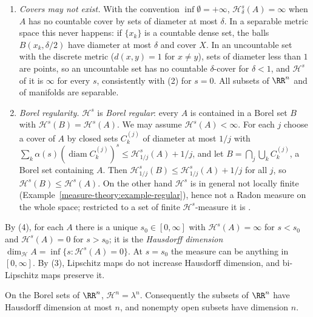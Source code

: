 \begin{remark}\label{geometric-measure-theory:remark-hausdorff-conventions}
\begin{enumerate}
\item \emph{Covers may not exist.} With the convention $\inf\emptyset = +\infty$, $\mathcal{H}^s_\delta(A) = \infty$ when $A$ has no countable cover by sets of diameter at most $\delta$. In a separable
metric space this never happens: if $\{x_k\}$ is a countable dense set, the balls $B(x_k, \delta/2)$ have diameter at most $\delta$ and cover $X$. In an uncountable set with the discrete metric
($d(x, y) = 1$ for $x \neq y$), sets of diameter less than $1$ are points, so an uncountable set has no countable $\delta$-cover for $\delta < 1$, and $\mathcal{H}^s$ of it is $\infty$ for every $s$,
consistently with (2) for $s = 0$. All subsets of $\RR^n$ and of manifolds are separable.
\item \emph{Borel regularity.} $\mathcal{H}^s$ is \emph{Borel regular}: every $A$ is contained in a Borel set $B$ with $\mathcal{H}^s(B) = \mathcal{H}^s(A)$. We may assume $\mathcal{H}^s(A) < \infty$. For
each $j$ choose a cover of $A$ by closed sets $C^{(j)}_k$ of diameter at most $1/j$ with $\sum_k\alpha(s)(\operatorname{diam}C^{(j)}_k)^s \leq \mathcal{H}^s_{1/j}(A) + 1/j$, and let
$B = \bigcap_j\bigcup_kC^{(j)}_k$, a Borel set containing $A$. Then $\mathcal{H}^s_{1/j}(B) \leq \mathcal{H}^s_{1/j}(A) + 1/j$ for all $j$, so $\mathcal{H}^s(B) \leq \mathcal{H}^s(A)$. On the other
hand $\mathcal{H}^s$ is in general not locally finite (Example~\ref{measure-theory:example-regular}), hence not a Radon measure on the whole space; restricted to a set of finite
$\mathcal{H}^s$-measure it is \cite[Section 1.1]{evans-gariepy}.
\end{enumerate}
\end{remark}

By (4), for each $A$ there is a unique $s_0 \in [0, \infty]$ with $\mathcal{H}^s(A) = \infty$ for $s < s_0$ and $\mathcal{H}^s(A) = 0$ for $s > s_0$; it is the \emph{Hausdorff dimension}
$\dim_{\mathcal{H}}A = \inf\{s : \mathcal{H}^s(A) = 0\}$. At $s = s_0$ the measure can be anything in $[0, \infty]$. By (3), Lipschitz maps do not increase Hausdorff dimension, and
bi-Lipschitz maps preserve it.

\begin{theorem}\label{geometric-measure-theory:theorem-hausdorff-lebesgue}
On the Borel sets of $\RR^n$, $\mathcal{H}^n = \lambda^n$. Consequently the subsets of $\RR^n$ have Hausdorff dimension at most $n$, and nonempty open subsets have dimension $n$.
\end{theorem}

